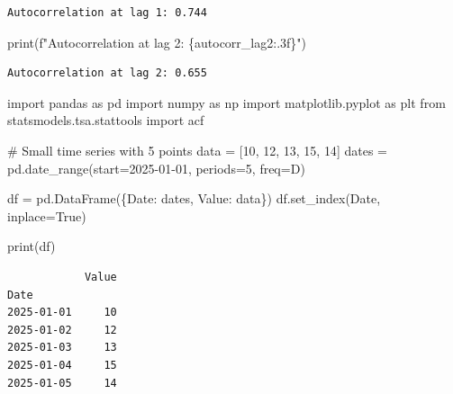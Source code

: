 \documentclass[
  11pt,
  a4paper,
]{report}
\newenvironment{Shaded}{\begin{snugshade}}{\end{snugshade}}
\newcommand{\BuiltInTok}[1]{\textcolor[rgb]{0.00,0.23,0.31}{#1}}
\newcommand{\CommentTok}[1]{\textcolor[rgb]{0.37,0.37,0.37}{#1}}
\newcommand{\DecValTok}[1]{\textcolor[rgb]{0.68,0.00,0.00}{#1}}
\newcommand{\ImportTok}[1]{\textcolor[rgb]{0.00,0.46,0.62}{#1}}
\newcommand{\NormalTok}[1]{\textcolor[rgb]{0.00,0.23,0.31}{#1}}
\newcommand{\OperatorTok}[1]{\textcolor[rgb]{0.37,0.37,0.37}{#1}}
\newcommand{\SpecialCharTok}[1]{\textcolor[rgb]{0.37,0.37,0.37}{#1}}
\newcommand{\SpecialStringTok}[1]{\textcolor[rgb]{0.13,0.47,0.30}{#1}}
\newcommand{\StringTok}[1]{\textcolor[rgb]{0.13,0.47,0.30}{#1}}
\newcommand{\VariableTok}[1]{\textcolor[rgb]{0.07,0.07,0.07}{#1}}
\begin{document}
\begin{verbatim}
Autocorrelation at lag 1: 0.744
\end{verbatim}

\begin{Shaded}
\begin{Highlighting}[]
\BuiltInTok{print}\NormalTok{(}\SpecialStringTok{f"Autocorrelation at lag 2: }\SpecialCharTok{\{}\NormalTok{autocorr\_lag2}\SpecialCharTok{:.3f\}}\SpecialStringTok{"}\NormalTok{)}
\end{Highlighting}
\end{Shaded}

\begin{verbatim}
Autocorrelation at lag 2: 0.655
\end{verbatim}

\begin{Shaded}
\begin{Highlighting}[]
\ImportTok{import}\NormalTok{ pandas }\ImportTok{as}\NormalTok{ pd}
\ImportTok{import}\NormalTok{ numpy }\ImportTok{as}\NormalTok{ np}
\ImportTok{import}\NormalTok{ matplotlib.pyplot }\ImportTok{as}\NormalTok{ plt}
\ImportTok{from}\NormalTok{ statsmodels.tsa.stattools }\ImportTok{import}\NormalTok{ acf}

\CommentTok{\# Small time series with 5 points}
\NormalTok{data }\OperatorTok{=}\NormalTok{ [}\DecValTok{10}\NormalTok{, }\DecValTok{12}\NormalTok{, }\DecValTok{13}\NormalTok{, }\DecValTok{15}\NormalTok{, }\DecValTok{14}\NormalTok{]}
\NormalTok{dates }\OperatorTok{=}\NormalTok{ pd.date\_range(start}\OperatorTok{=}\StringTok{\textquotesingle{}2025{-}01{-}01\textquotesingle{}}\NormalTok{, periods}\OperatorTok{=}\DecValTok{5}\NormalTok{, freq}\OperatorTok{=}\StringTok{\textquotesingle{}D\textquotesingle{}}\NormalTok{)}

\NormalTok{df }\OperatorTok{=}\NormalTok{ pd.DataFrame(\{}\StringTok{\textquotesingle{}Date\textquotesingle{}}\NormalTok{: dates, }\StringTok{\textquotesingle{}Value\textquotesingle{}}\NormalTok{: data\})}
\NormalTok{df.set\_index(}\StringTok{\textquotesingle{}Date\textquotesingle{}}\NormalTok{, inplace}\OperatorTok{=}\VariableTok{True}\NormalTok{)}

\BuiltInTok{print}\NormalTok{(df)}
\end{Highlighting}
\end{Shaded}

\begin{verbatim}
            Value
Date             
2025-01-01     10
2025-01-02     12
2025-01-03     13
2025-01-04     15
2025-01-05     14
\end{verbatim}
\end{document}
